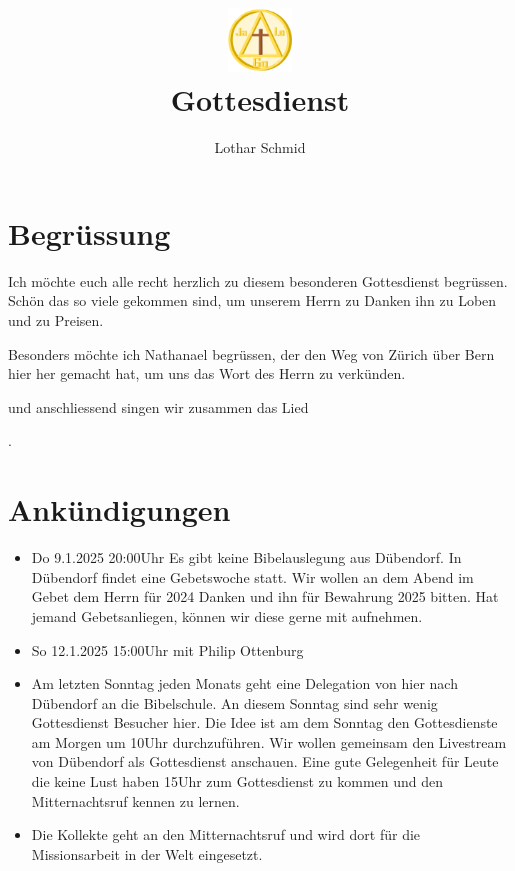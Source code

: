 \documentclass{../inc/mybib}
\title{\includegraphics[height=48pt]{assets/images/logo.png}\\Gottesdienst}
\author{Lothar Schmid}
\begin{document}
\maketitle
\section{Begrüssung}

Ich möchte euch alle recht herzlich zu diesem besonderen Gottesdienst begrüssen. Schön das so viele gekommen sind, um unserem Herrn zu Danken ihn zu Loben und zu Preisen.

Besonders möchte ich Nathanael begrüssen, der den Weg von Zürich über Bern hier her gemacht hat, um uns das Wort des Herrn zu verkünden. 

\noindent
\beten{} und anschliessend singen wir zusammen das Lied

\noindent
{}.

\section{Ankündigungen}
\begin{itemize}
    \item {} Do 9.1.2025 20:00Uhr Es gibt keine Bibelauslegung aus Dübendorf. In Dübendorf findet eine Gebetswoche statt. Wir wollen an dem Abend im Gebet dem Herrn für 2024 Danken und ihn für Bewahrung 2025 bitten. Hat jemand Gebetsanliegen, können wir diese gerne mit aufnehmen.
    \item {} So 12.1.2025 15:00Uhr mit Philip Ottenburg
    \item {} Am letzten Sonntag jeden Monats geht eine Delegation von hier nach Dübendorf an die Bibelschule. An diesem Sonntag sind sehr wenig Gottesdienst Besucher hier. Die Idee ist am dem Sonntag den Gottesdienste am Morgen um 10Uhr durchzuführen. Wir wollen gemeinsam den Livestream von Dübendorf als Gottesdienst anschauen. Eine gute Gelegenheit für Leute die keine Lust haben 15Uhr zum Gottesdienst zu kommen und den Mitternachtsruf kennen zu lernen.
    \item {} Die Kollekte geht an den Mitternachtsruf und wird dort für die Missionsarbeit in der Welt eingesetzt.
\end{itemize}
\end{document}
